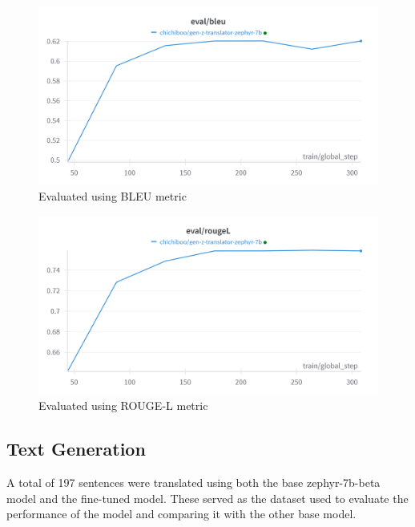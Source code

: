 \begin{figure}[!htbp]
	\centering
	\includegraphics[scale=0.2]{figures/BLEUEvaluation.png}
	\caption{Evaluated using BLEU metric}
	\label{fig:bleu_eval}
\end{figure}
\begin{figure}[!htbp]
	\centering
	\includegraphics[scale=0.2]{figures/ROUGELEvaluation.png}
	\caption{Evaluated using ROUGE-L metric}
	\label{fig:rouge_eval}
\end{figure}
\FloatBarrier
\subsection{Text Generation}
A total of 197 sentences were translated using both the base zephyr-7b-beta model and the fine-tuned model. These served as the dataset used to evaluate the performance of the model and comparing it with the other base model.

